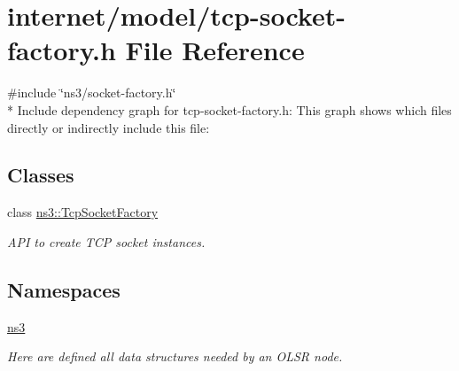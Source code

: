 \hypertarget{tcp-socket-factory_8h}{}\section{internet/model/tcp-\/socket-\/factory.h File Reference}
\label{tcp-socket-factory_8h}
{\ttfamily \#include \char`\"{}ns3/socket-\/factory.\+h\char`\"{}}\\*
Include dependency graph for tcp-\/socket-\/factory.h\+:
This graph shows which files directly or indirectly include this file\+:
\subsection*{Classes}
\begin{DoxyCompactItemize}
\item 
class \hyperlink{classns3_1_1TcpSocketFactory}{ns3\+::\+Tcp\+Socket\+Factory}
\begin{DoxyCompactList}\small\item\em A\+PI to create T\+CP socket instances. \end{DoxyCompactList}\end{DoxyCompactItemize}
\subsection*{Namespaces}
\begin{DoxyCompactItemize}
\item 
 \hyperlink{namespacens3}{ns3}
\begin{DoxyCompactList}\small\item\em Here are defined all data structures needed by an O\+L\+SR node. \end{DoxyCompactList}\end{DoxyCompactItemize}
